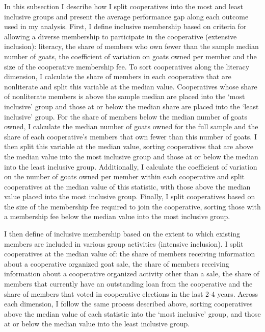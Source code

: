 \documentclass[11pt]{article}
\begin{document}
In this subsection I describe how I split cooperatives into the most and least inclusive groups and present the average performance gap along each outcome used in my analysis. First, I define inclusive membership based on criteria for allowing a diverse membership to participate in the cooperative (extensive inclusion): literacy, the share of members who own fewer than the sample median number of goats, the coefficient of variation on goats owned per member and the size of the cooperative membership fee. To sort cooperatives along the literacy dimension, I calculate the share of members in each cooperative that are nonliterate and split this variable at the median value. Cooperatives whose share of nonliterate members is above the sample median are placed into the `most inclusive' group and those at or below the median share are placed into the `least inclusive' group. For the share of members below the median number of goats owned, I calculate the median number of goats owned for the full sample and the share of each cooperative's members that own fewer than this number of goats. I then split this variable at the median value, sorting cooperatives that are above the median value into the most inclusive group and those at or below the median into the least inclusive group. Additionally, I calculate the coefficient of variation on the number of goats owned per member within each cooperative and split cooperatives at the median value of this statistic, with those above the median value placed into the most inclusive group. Finally, I split cooperatives based on the size of the membership fee required to join the cooperative, sorting those with a membership fee below the median value into the most inclusive group. 

I then define of inclusive membership based on the extent to which existing members are included in various group activities (intensive inclusion). I split cooperatives at the median value of: the share of members receiving information about a cooperative organized goat sale, the share of members receiving information about a cooperative organized activity other than a sale, the share of members that currently have an outstanding loan from the cooperative and the share of members that voted in cooperative elections in the last 2-4 years. Across each dimension, I follow the same process described above, sorting cooperatives above the median value of each statistic into the `most inclusive' group, and those at or below the median value into the least inclusive group.
\end{document}
